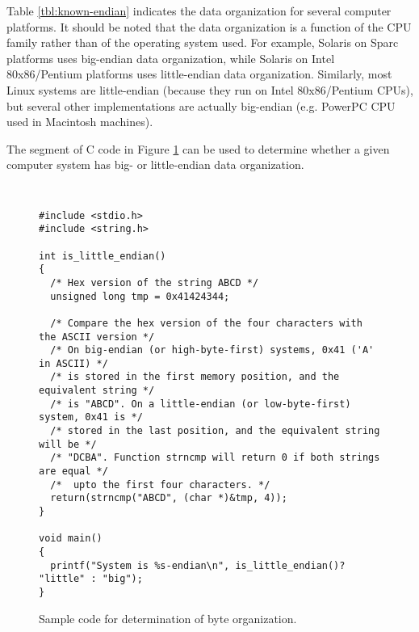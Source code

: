 Table \ref{tbl:known-endian} indicates the data organization for
several computer platforms. It should be noted that the data
organization is a function of the CPU family rather than of the
operating system used. For example, Solaris on Sparc platforms uses
big-endian data organization, while Solaris on Intel 80x86/Pentium
platforms uses little-endian data organization. Similarly, most Linux
systems are little-endian (because they run on Intel 80x86/Pentium
CPUs), but several other implementations are actually big-endian
(e.g. PowerPC CPU used in Macintosh machines).

The segment of C code in Figure \ref{fig:find-big-ltl-end} can be used
to determine whether a given computer system has big- or little-endian
data organization.

\begin{figure}[ht]
\begin{framed}
{\tt\small
\begin{verbatim}
#include <stdio.h>
#include <string.h>

int is_little_endian()
{
  /* Hex version of the string ABCD */
  unsigned long tmp = 0x41424344;

  /* Compare the hex version of the four characters with the ASCII version */
  /* On big-endian (or high-byte-first) systems, 0x41 ('A' in ASCII) */
  /* is stored in the first memory position, and the equivalent string */
  /* is "ABCD". On a little-endian (or low-byte-first) system, 0x41 is */
  /* stored in the last position, and the equivalent string will be */
  /* "DCBA". Function strncmp will return 0 if both strings are equal */
  /*  upto the first four characters. */
  return(strncmp("ABCD", (char *)&tmp, 4));
}

void main()
{
  printf("System is %s-endian\n", is_little_endian()? "little" : "big");
}
\end{verbatim}
}
\end{framed}
  \caption{Sample code for determination of byte organization.
           \label{fig:find-big-ltl-end}}
\end{figure}

